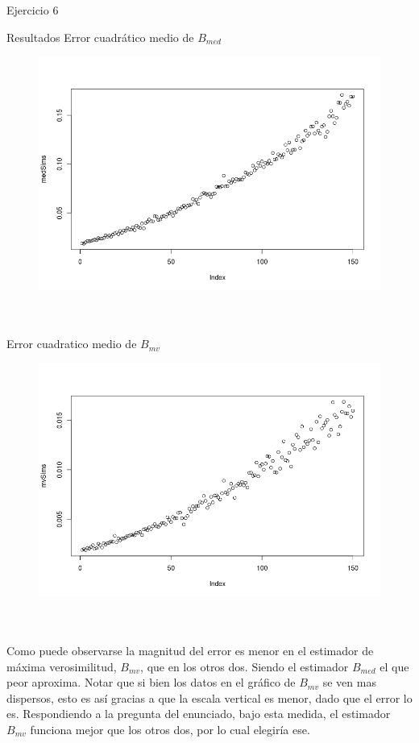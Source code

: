 \begin{section}{Ejercicio 6}
\begin{subsection}{Resultados}
Error cuadrático medio de $B_{med}$
\begin{figure}[H]
\includegraphics[scale=0.65]{plots/medSims.png}
\centering
\end{figure}
~\\
~\\

Error cuadratico medio de $B_{mv}$
\begin{figure}[H]
\includegraphics[scale=0.65]{plots/mvSims.png}
\centering
\end{figure}
~\\
~\\
Como puede observarse la magnitud del error es menor en el estimador de máxima verosimilitud, $B_{mv}$, que en los otros dos. Siendo el estimador $B_{med}$ el que peor aproxima. Notar que si bien los datos en el gráfico de $B_{mv}$ se ven mas dispersos, esto es así gracias a que la escala vertical es menor, dado que el error lo es.
Respondiendo a la pregunta del enunciado, bajo esta medida, el estimador $B_{mv}$ funciona mejor que los otros dos, por lo cual elegiría ese.

\end{subsection}
\end{section}